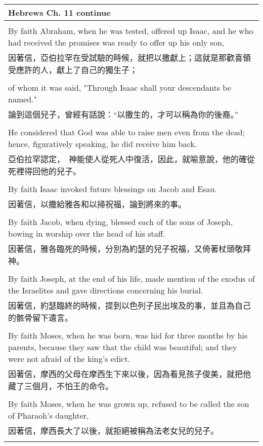\begin{tabularx}{\textwidth}{p{}}
\hline
Hebrews Ch. 11 continue \\
\hline \\
By faith Abraham, when he was tested, offered up Isaac, and he who had received the promises was ready to offer up his only son, \\
因著信，亞伯拉罕在受試驗的時候，就把以撒獻上；這就是那歡喜領受應許的人，獻上了自己的獨生子； \\ \\
of whom it was said, "Through Isaac shall your descendants be named." \\
論到這個兒子，曾經有話說：“以撒生的，才可以稱為你的後裔。” \\ \\
He considered that God was able to raise men even from the dead; hence, figuratively speaking, he did receive him back. \\
亞伯拉罕認定，　神能使人從死人中復活，因此，就喻意說，他的確從死裡得回他的兒子。 \\ \\
By faith Isaac invoked future blessings on Jacob and Esau. \\
因著信，以撒給雅各和以掃祝福，論到將來的事。 \\ \\
By faith Jacob, when dying, blessed each of the sons of Joseph, bowing in worship over the head of his staff. \\
因著信，雅各臨死的時候，分別為約瑟的兒子祝福，又倚著杖頭敬拜　神。 \\ \\
By faith Joseph, at the end of his life, made mention of the exodus of the Israelites and gave directions concerning his burial. \\
因著信，約瑟臨終的時候，提到以色列子民出埃及的事，並且為自己的骸骨留下遺言。 \\ \\
By faith Moses, when he was born, was hid for three months by his parents, because they saw that the child was beautiful; and they were not afraid of the king's edict. \\
因著信，摩西的父母在摩西生下來以後，因為看見孩子俊美，就把他藏了三個月，不怕王的命令。 \\ \\
By faith Moses, when he was grown up, refused to be called the son of Pharaoh's daughter, \\
因著信，摩西長大了以後，就拒絕被稱為法老女兒的兒子。 \\ \\

\end{tabularx}
